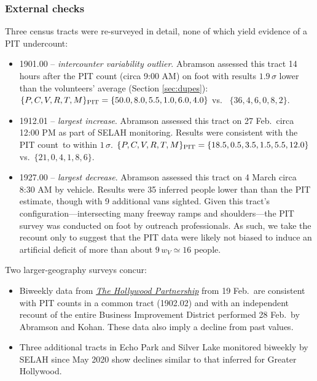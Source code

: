 \documentclass[11pt,twocolumn]{article}
\def\Count{count}
\begin{document}
\subsubsection{External checks}

Three census tracts were re-surveyed in detail, none of which yield evidence of a PIT undercount:
\begin{itemize}
	\item 1901.00 -- {\it intercounter variability outlier}. Abramson
		  assessed this tract 14 hours after the PIT count (circa 9:00 AM) on foot with results 
		  $1.9\,\sigma$ lower than the volunteers' average (Section \ref{sec:dupes}):
		  $\{P,C,V,R,T,M\}_{\rm PIT} = \{50.0, 8.0, 5.5, 1.0, 6.0, 4.0\}$ vs.~
		$\{36, 4, 6, 0, 8, 2\}$.
	\item 1912.01 -- {\it largest increase}. Abramson assessed this tract on 
		27 Feb.\ circa 12:00 PM as part of SELAH monitoring. Results were consistent with 
		the PIT \Count\ to within $1\,\sigma$. $\{P,C,V,R,T,M\}_{\rm PIT}=\{18.5,0.5, 3.5, 1.5, 5.5, 12.0\}$ 
		vs.~$\{21,0,4,1,8,6\}$.
	\item 1927.00 -- {\it largest decrease}. Abramson assessed this tract
		on 4 March circa 8:30 AM by vehicle. Results were 35 inferred people lower than than the PIT 
		estimate, though with 9 additional vans sighted. Given this tract's configuration---intersecting 
		many freeway ramps and shoulders---the PIT survey was conducted on foot by outreach professionals. 
		As such, we take the recount only to suggest that the PIT data were likely not biased to induce an 
		artificial deficit of more than about $9\,w_{V}\simeq 16$ people.
\end{itemize}

Two larger-geography surveys concur:%
\begin{itemize}
	\item Biweekly data from \href{https://hollywoodpartnership.com/}{\it The Hollywood Partnership} 
		from 19 Feb.\ are consistent with PIT counts in a common tract (1902.02) and with an independent 
		recount of the entire Business Improvement District performed 28 Feb.\ by Abramson and 
		Kohan. These data also imply a decline from past values.
	\item Three additional tracts in Echo Park and Silver Lake monitored biweekly by SELAH since May 2020 
		show declines similar to that inferred for Greater Hollywood.
\end{itemize}
%
%
\end{document}
